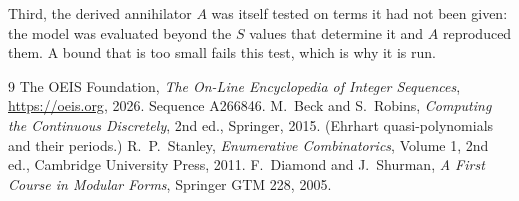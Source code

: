 \documentclass[11pt,a4paper]{article}
\theoremstyle{plain}
\theoremstyle{definition}
\begin{document}
Third, the derived annihilator $A$ was itself tested on terms it had not been given: the model
was evaluated beyond the $S$ values that determine it and $A$ reproduced them. A bound that is
too small fails this test, which is why it is run.

\begin{thebibliography}{9}
 The OEIS Foundation, \emph{The On-Line Encyclopedia of Integer
Sequences}, \url{https://oeis.org}, 2026. Sequence A266846.
 M.~Beck and S.~Robins, \emph{Computing the Continuous Discretely},
2nd ed., Springer, 2015. (Ehrhart quasi-polynomials and their periods.)
 R.~P.~Stanley, \emph{Enumerative Combinatorics}, Volume 1, 2nd ed.,
Cambridge University Press, 2011.
 F.~Diamond and J.~Shurman, \emph{A First Course in Modular Forms},
Springer GTM 228, 2005.
\end{thebibliography}
\end{document}

